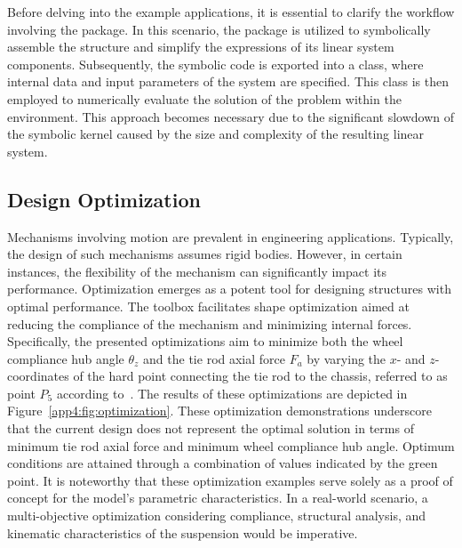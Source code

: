 Before delving into the example applications, it is essential to clarify the workflow involving the \TrussMe{} package. In this scenario, the \TrussMe{} package is utilized to symbolically assemble the structure and simplify the expressions of its linear system components. Subsequently, the symbolic code is exported into a \Matlab{} class, where internal data and input parameters of the system are specified. This \Matlab{} class is then employed to numerically evaluate the solution of the problem within the \Simulink{} environment. This approach becomes necessary due to the significant slowdown of the symbolic kernel caused by the size and complexity of the resulting linear system.

\subsection{Design Optimization}

Mechanisms involving motion are prevalent in engineering applications. Typically, the design of such mechanisms assumes rigid bodies. However, in certain instances, the flexibility of the mechanism can significantly impact its performance. Optimization emerges as a potent tool for designing structures with optimal performance. The \TrussMe{} toolbox facilitates shape optimization aimed at reducing the compliance of the mechanism and minimizing internal forces. Specifically, the presented optimizations aim to minimize both the wheel compliance hub angle $\theta_z$ and the tie rod axial force $F_a$ by varying the $x$- and $z$- coordinates of the hard point connecting the tie rod to the chassis, referred to as point $P_5$ according to~\cite{larcher2024imece_symbolic}. The results of these optimizations are depicted in Figure~\ref{app4:fig:optimization}. These optimization demonstrations underscore that the current design does not represent the optimal solution in terms of minimum tie rod axial force and minimum wheel compliance hub angle. Optimum conditions are attained through a combination of values indicated by the green point. It is noteworthy that these optimization examples serve solely as a proof of concept for the model's parametric characteristics. In a real-world scenario, a multi-objective optimization considering compliance, structural analysis, and kinematic characteristics of the suspension would be imperative.

